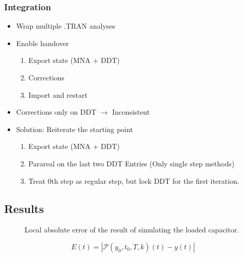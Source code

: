 \begin{frame}
    \frametitle{Integration}
    \begin{itemize}[<+->]
        \item Wrap multiple .TRAN analyses
        \item Enable handover
            \begin{enumerate}
                \item Export state (MNA + DDT)
                \item Corrections
                \item Import and restart
            \end{enumerate}
        \item Corrections only on DDT \(\rightarrow\) Inconsistent
        \item Solution: Reiterate the starting point
            \begin{enumerate}
                \item Export state (MNA + DDT)
                \item Parareal on the last two DDT Entries (Only single step methods)
                \item Treat 0th step as regular step, but lock DDT for the first iteration.
            \end{enumerate}
    \end{itemize}
    \end{frame}

\subsection{Results}


\begin{frame}
    \begin{figure}[ht]
        \centering
        \scalebox{0.8}{}
        \caption{Local absolute error of the result of simulating the loaded capacitor.}
        \label{fig:iters_log}
    \end{figure}
    \begin{equation*}
        E(t) = \left|\mathcal{P}(y_0,t_0,T,k)(t)-y(t)\right|
    \end{equation*}
\end{frame}

